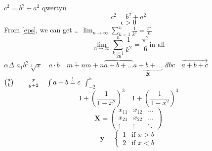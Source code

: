 \documentclass[11pt, oneside, a4paper]{article}
\begin{document}
\begin{math}
    c^{2} = b^{2} + a^{2}
\end{math}
qwertyu
\begin{displaymath}
    c^{2} = b^{2} + a^{2}
\end{displaymath}
\begin{equation}\label{eps}
    \epsilon > 0
\end{equation} 
From \ref{eps}, we can get \ldots{}
$\lim_{n \to \infty} \sum_{k=1}^n \frac{1}{k^2} = \frac{\pi^2}{6} $
\begin{displaymath}
    \lim_{n \to \infty} \sum_{k=1}^n \frac{1}{k^2} = \frac{\pi^2}{6} \textrm{in all}
\end{displaymath}
$ \alpha \Delta $
$ a_{1} b^{2} \sqrt[3]{x} \quad a\cdot b \quad \overline{m+n} \underline{m+n} \overbrace{a+b+...}^{26} \underbrace{a+b+...}_{26} $
$ \vec abc \quad \overrightarrow{a+b+c} \\ $
$ {n \choose k}\qquad {x \atop y+2} \quad \int a+b\stackrel{!}{=}c $
$ \int_{-2}^{5} $
\begin{displaymath}
    1 + \left( \frac{1}{ 1-x^{2} }\right) ^3 \quad
    1 + ( \frac{1}{ 1-x^{2} }) ^3
\end{displaymath}
\begin{displaymath}
    \mathbf{X} = 
    \left ( 
        \begin{array}{ccc} %
            x_{11} & x_{12} & \ldots{} \\  %
            x_{21} & x_{22} & \ldots{} \\
            \vdots & \vdots & \ddots
        \end{array} 
    \right)
\end{displaymath}
\begin{displaymath}
    \mathbf{y} = 
    \left \{
        \begin{array}{ccc}
            1 & \textrm{if $x>b$} \\
            2 & \textrm{if $x<b$}
        \end{array}
    \right .
\end{displaymath}
\end{document}
